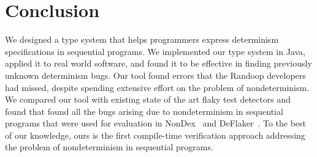 \section{Conclusion}\label{sec:conclusion}

We designed a type system that helps programmers express determinism specifications
in sequential programs. 
We implemented our type system in Java, applied it to real world 
software, and found it to be effective in finding previously unknown determinism bugs. 
Our tool \theDeterminismChecker found errors that the
Randoop developers had missed, despite spending
extensive effort on the
problem of nondeterminism. We compared our tool with existing state of the art flaky test detectors
and found that \theDeterminismChecker found all the bugs arising due to nondeterminism
in sequential programs that were used for evaluation in NonDex~\cite{ShiGLM2016} and DeFlaker~\cite{BellLHEYM2018}.
To the best of our knowledge, ours is the
first compile-time verification approach addressing the problem of
nondeterminism in sequential programs.
